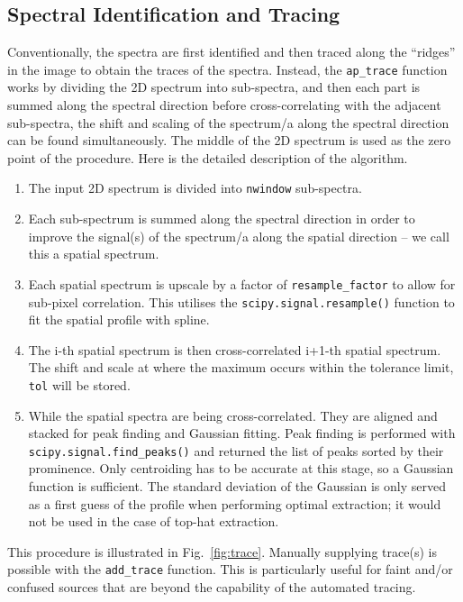 \documentclass[fleqn,usenatbib]{mnras}
\begin{document}
\subsection{Spectral Identification and Tracing}
\label{sec:tracing}
Conventionally, the spectra are first identified and then traced along
the ``ridges'' in the image to obtain the traces of the spectra.
Instead, the \texttt{ap\_trace} function works by dividing the 2D
spectrum into sub-spectra, and then each part is summed along the
spectral direction before cross-correlating with the adjacent
sub-spectra, the shift and scaling of the spectrum/a along the
spectral direction can be found simultaneously. The middle of the
2D spectrum is used as the zero point of the procedure. Here is the
detailed description of the algorithm.
\begin{enumerate}
    \item
        The input 2D spectrum is divided into \texttt{nwindow}
        sub-spectra.
    \item
        Each sub-spectrum is summed along the spectral direction
        in order to improve the signal(s) of the spectrum/a along
        the spatial direction – we call this a spatial spectrum.
    \item
        Each spatial spectrum is upscale by a factor of
        \texttt{resample\_factor} to allow for sub-pixel correlation.
        This utilises the \texttt{scipy.signal.resample()} function
        to fit the spatial profile with spline.
    \item
        The i-th spatial spectrum is then cross-correlated i+1-th
        spatial spectrum. The shift and scale at where the maximum
        occurs within the tolerance limit, \texttt{tol} will be stored.
    \item
        While the spatial spectra are being cross-correlated. They
        are aligned and stacked for peak finding and Gaussian fitting.
        Peak finding is performed with
        \texttt{scipy.signal.find\_peaks()} and returned the list of
        peaks sorted by their prominence. Only centroiding has to be
        accurate at this stage, so a Gaussian function is sufficient.
        The standard deviation of the Gaussian is only served as a
        first guess of the profile when performing optimal extraction;
        it would not be used in the case of top-hat extraction.
\end{enumerate}

This procedure is illustrated in Fig.~\ref{fig:trace}. Manually
supplying trace(s) is possible with the \texttt{add\_trace}
function. This is particularly useful for faint and/or confused
sources that are beyond the capability of the automated tracing.
\end{document}
